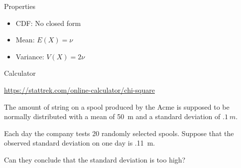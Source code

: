 \begin{frame}

  \begin{block}{Properties}
        \begin{itemize}
        \item CDF: No closed form

          
        \item Mean: $E(X)=\nu$
      
        \item Variance: $V(X)=2\nu$


        \end{itemize}
\end{block}

\begin{block}{Calculator}

\begin{center}
\url{https://stattrek.com/online-calculator/chi-square}
\end{center}
\end{block}
\end{frame}

\begin{frame}

  \begin{block}{\examplectd}
  The amount of string on a spool produced by the Acme is supposed to be normally distributed with a mean of 50~m and a standard deviation of $.1~m$. 
  
  \medskip
  
  Each day the company tests 20 randomly selected spools. Suppose that the observed standard deviation on one day is .11~m.
  
  \medskip
  
  Can they conclude that the standard deviation is too high?
  \end{block}
\end{frame}



